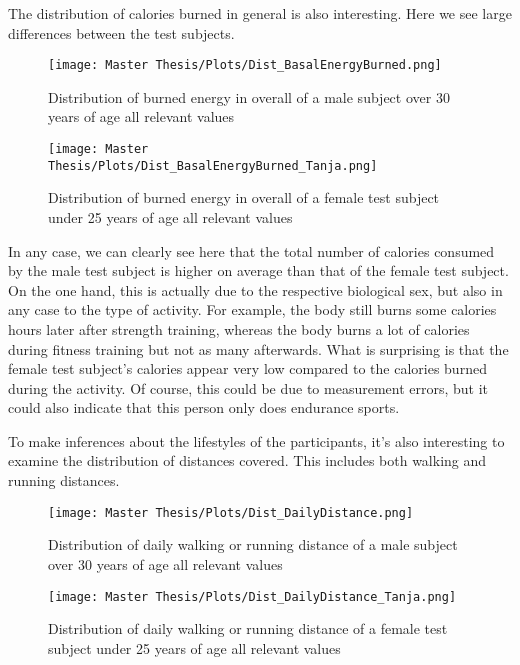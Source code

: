 The distribution of calories burned in general is also interesting. Here we see large differences between the test subjects. 
\FloatBarrier
\begin{figure}[h!]
  \centering
  \begin{minipage}[b]{0.45\linewidth}
    \texttt{[image: Master Thesis/Plots/Dist\_BasalEnergyBurned.png]}
    \caption{Distribution of burned energy in overall of a male subject over 30 years of age all relevant values}
    \label{fig:ValuesMichibasal}
  \end{minipage}
  \quad %
  \begin{minipage}[b]{0.45\linewidth}
    \texttt{[image: Master Thesis/Plots/Dist\_BasalEnergyBurned\_Tanja.png]}
    \caption{Distribution of burned energy in overall of a female test subject under 25 years of age all relevant values}
    \label{fig:ValuesTanjabasal}
  \end{minipage}
\end{figure}
\FloatBarrier

In any case, we can clearly see here that the total number of calories consumed by the male test subject is higher on average than that of the female test subject. On the one hand, this is actually due to the respective biological sex, but also in any case to the type of activity. For example, the body still burns some calories hours later after strength training, whereas the body burns a lot of calories during fitness training but not as many afterwards. What is surprising is that the female test subject's calories appear very low compared to the calories burned during the activity. Of course, this could be due to measurement errors, but it could also indicate that this person only does endurance sports.


To make inferences about the lifestyles of the participants, it's also interesting to examine the distribution of distances covered. This includes both walking and running distances.

\FloatBarrier
\begin{figure}[h!]
  \centering
  \begin{minipage}[b]{0.7\linewidth}
    \texttt{[image: Master Thesis/Plots/Dist\_DailyDistance.png]}
    \caption{Distribution of daily walking or running distance of a male subject over 30 years of age all relevant values}
    \label{fig:ValuesMichiwalk}
  \end{minipage}
  \quad %
  \begin{minipage}[b]{0.7\linewidth}
    \texttt{[image: Master Thesis/Plots/Dist\_DailyDistance\_Tanja.png]}
    \caption{Distribution of daily walking or running distance of a female test subject under 25 years of age all relevant values}
    \label{fig:ValuesTanjawalk}
  \end{minipage}
\end{figure}
\FloatBarrier

